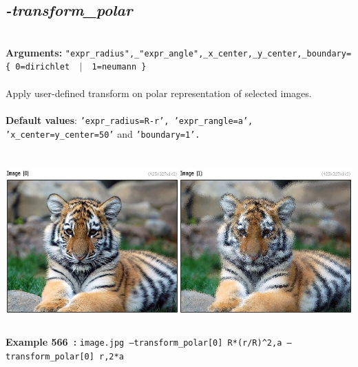 \documentclass[a4paper,11pt,twoside]{book}
\begin{document}
\subsection{\emph{-transform\_polar} }\vspace*{-0.5em}
~\\\textbf{Arguments: } 
{\small \texttt{"expr\_radius",\_"expr\_angle",\_x\_center,\_y\_center,\_boundary=\{ 0=dirichlet ~$|$~ 1=neumann \}}}\\~\\
Apply user-defined transform on polar representation of selected images.
~\\~\\\textbf{Default values}: {\small \texttt{'expr\_radius=R-r', 'expr\_rangle=a', 'x\_center=y\_center=50'} and \texttt{'boundary=1'.}}
\begin{center}\includegraphics[keepaspectratio=true,height=7cm,width=\textwidth]{img/gmic_def566.jpg}\\
{\footnotesize \textbf{Example 566~:} \texttt{image.jpg --transform\_polar[0] R*(r/R)\textasciicircum 2,a --transform\_polar[0] r,2*a}}
\end{center}
\end{document}
